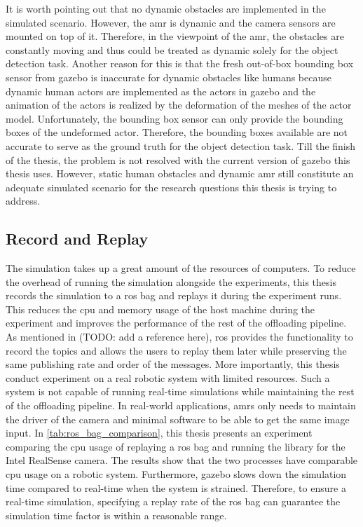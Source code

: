 It is worth pointing out that no dynamic obstacles are implemented in the simulated scenario. However, the \gls{amr} is dynamic and the camera sensors are mounted on top of it. Therefore, in the viewpoint of the \gls{amr}, the obstacles are constantly moving and thus could be treated as dynamic solely for the object detection task. Another reason for this is that the fresh out-of-box bounding box sensor from \gls{gazebo} is inaccurate for dynamic obstacles like humans because dynamic human actors are implemented as the actors in \gls{gazebo} and the animation of the actors is realized by the deformation of the meshes of the actor model. Unfortunately, the bounding box sensor can only provide the bounding boxes of the undeformed actor. Therefore, the bounding boxes available are not accurate to serve as the ground truth for the object detection task. Till the finish of the thesis, the problem is not resolved with the current version of \gls{gazebo} this thesis uses. However, static human obstacles and dynamic \gls{amr} still constitute an adequate simulated scenario for the research questions this thesis is trying to address. 

\subsection{Record and Replay}

The simulation takes up a great amount of the resources of computers. To reduce the overhead of running the simulation alongside the experiments, this thesis records the simulation to a \gls{ros} bag and replays it during the experiment runs. This reduces the \gls{cpu} and memory usage of the host machine during the experiment and improves the performance of the rest of the offloading pipeline. As mentioned in (TODO: add a reference here), \gls{ros} provides the functionality to record the topics and allows the users to replay them later while preserving the same publishing rate and order of the messages. More importantly, this thesis conduct experiment on a real robotic system with limited resources. Such a system is not capable of running real-time simulations while maintaining the rest of the offloading pipeline. In real-world applications, \glspl{amr} only needs to maintain the driver of the camera and minimal software to be able to get the same image input. In \cref{tab:ros_bag_comparison}, this thesis presents an experiment comparing the \gls{cpu} usage of replaying a \gls{ros} bag and running the library for the Intel RealSense camera. The results show that the two processes have comparable \gls{cpu} usage on a robotic system. Furthermore, \gls{gazebo} slows down the simulation time compared to real-time when the system is strained. Therefore, to ensure a real-time simulation, specifying a replay rate of the \gls{ros} bag can guarantee the simulation time factor is within a reasonable range. 

